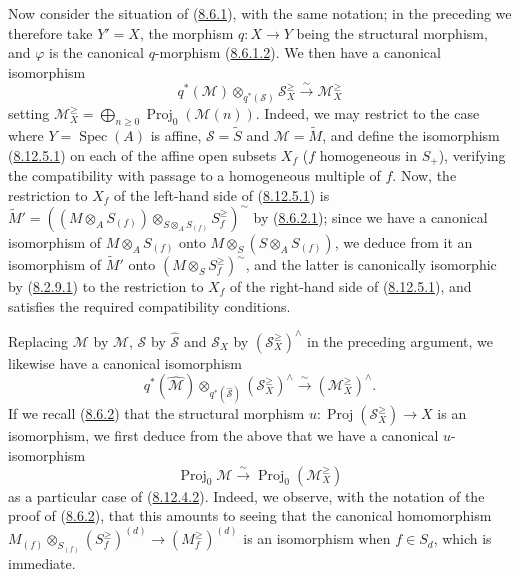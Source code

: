 \begin{env}[8.12.5]
\label{II.8.12.5}
Now consider the situation of (\hyperref[II.8.6.1]{8.6.1}),
with the same notation; in the preceding we therefore take $Y'=X$, the
morphism $q:X\to Y$ being the structural morphism, and $\varphi$ is the
canonical $q$-morphism (\hyperref[II.8.6.1.2]{8.6.1.2}). We then have a
canonical isomorphism
\begin{equation}
\label{II.8.12.5.1}
  q^*(\mathcal{M})\otimes_{q^*(\mathcal{S})}\mathcal{S}_X^{\geq}
  \xrightarrow{\sim}\mathcal{M}_X^{\geq}
\tag{8.12.5.1}
\end{equation}
setting
$\mathcal{M}_X^{\geq}=\bigoplus_{n\geq0}\operatorname{Proj}_0(\mathcal{M}(n))$.
Indeed, we may restrict to the case where $Y=\operatorname{Spec}(A)$ is
affine, $\mathcal{S}=\widetilde{S}$ and $\mathcal{M}=\widetilde{M}$, and
define the isomorphism (\hyperref[II.8.12.5.1]{8.12.5.1}) on each of the
affine open subsets $X_f$ ($f$ homogeneous in $S_+$), verifying the
compatibility with passage to a homogeneous multiple of $f$. Now, the
restriction to $X_f$ of the left-hand side of
(\hyperref[II.8.12.5.1]{8.12.5.1}) is
$\widetilde{M}'=
\left((M\otimes_A S_{(f)})
\otimes_{S\otimes_A S_{(f)}}S_f^{\geq}\right)^{\sim}$ by
(\hyperref[II.8.6.2.1]{8.6.2.1}); since we have a canonical isomorphism of
$M\otimes_A S_{(f)}$ onto $M\otimes_S(S\otimes_A S_{(f)})$, we deduce from
it an isomorphism of $\widetilde{M}'$ onto
$\left(M\otimes_S S_f^{\geq}\right)^{\sim}$, and the latter is
canonically isomorphic by (\hyperref[II.8.2.9.1]{8.2.9.1}) to the
restriction to $X_f$ of the right-hand side of
(\hyperref[II.8.12.5.1]{8.12.5.1}), and satisfies the required
compatibility conditions.

Replacing $\mathcal{M}$ by $\widehat{\mathcal{M}}$, $\mathcal{S}$ by
$\widehat{\mathcal{S}}$ and $\mathcal{S}_X$ by
$(\mathcal{S}_X^{\geq})^{\wedge}$ in the preceding argument, we likewise
have a canonical isomorphism
\begin{equation}
\label{II.8.12.5.2}
  q^*(\widehat{\mathcal{M}})
  \otimes_{q^*(\widehat{\mathcal{S}})}(\mathcal{S}_X^{\geq})^{\wedge}
  \xrightarrow{\sim}(\mathcal{M}_X^{\geq})^{\wedge}.
\tag{8.12.5.2}
\end{equation}
If we recall (\hyperref[II.8.6.2]{8.6.2}) that the structural morphism
$u:\operatorname{Proj}(\mathcal{S}_X^{\geq})\to X$ is an
isomorphism, we first deduce from the above that we have a canonical
$u$-isomorphism
\begin{equation}
\label{II.8.12.5.3}
  \operatorname{Proj}_0\mathcal{M}
  \xrightarrow{\sim}\operatorname{Proj}_0(\mathcal{M}_X^{\geq})
\tag{8.12.5.3}
\end{equation}
as a particular case of (\hyperref[II.8.12.4.2]{8.12.4.2}). Indeed, we
observe, with the notation of the proof of
(\hyperref[II.8.6.2]{8.6.2}), that this amounts to seeing that
the canonical homomorphism
$M_{(f)}\otimes_{S_{(f)}}(S_f^{\geq})^{(d)}\to(M_f^{\geq})^{(d)}$ is an
isomorphism when $f\in S_d$, which is immediate.


\end{env}
